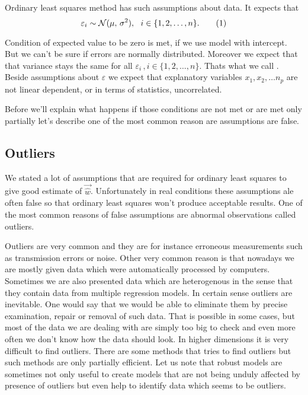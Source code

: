 Ordinary least squares method has such assumptions about data. It expects that
\begin{equation}
    \varepsilon_i \sim \mathcal{N}(\mu,\,\sigma^{2})\\, \ \ i \in \{{1,2,\ldots,n\}}. \numberthis
\end{equation}

Condition of expected value to be zero is met, if we use model with intercept. But we can't be sure if errors are normally distributed. Moreover we expect that that variance stays the same for all $\varepsilon_i\,, i \in \{{1,2,\ldots,n\}}$. Thats what we call . Beside assumptions about $\varepsilon$ we expect that explanatory variables $x_1,x_2,\ldots n_p$ are not linear dependent, or in terms of statistics, uncorrelated.

Before we'll explain what happens if those conditions are not met or are met only partially let's describe one of the most common reason are assumptions are false.

\subsection{Outliers}
We stated a lot of assumptions that are required for ordinary least squares to give 
good estimate of $\vec{\hat{w}}$. Unfortunately in  real conditions these assumptions ale often false so that ordinary least squares won't produce acceptable results. One of the most common reasons of false assumptions are abnormal observations called outliers.

Outliers are very common and they are for instance erroneous measurements such as transmission errors or noise. Other very common reason is that nowadays we are mostly given data which were automatically processed by computers. Sometimes we are also presented data which are heterogenous in the sense  that they contain data from multiple regression models. In certain sense outliers are inevitable. One would say that we would be able to eliminate them by precise examination, repair or removal of such data. That is possible in some cases, but most of the data we are dealing with are simply too big to check and even more often we don't know how the data should look. In higher dimensions it is very difficult to find outliers. There are some methods that tries to find outliers but such methods are only partially efficient. Let us note that robust models are sometimes not only useful to create models that are not being unduly affected by presence of outliers but even help to identify data which seems to be outliers. 

